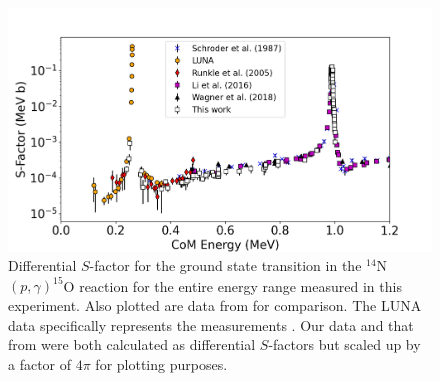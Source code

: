 \begin{figure}
		\includegraphics[width=1.0\linewidth]{figures/full_gs.png}
	\caption{Differential $S$-factor for the ground state transition in the $^{14}$N$\left( p,\gamma \right) ^{15}$O reaction for the entire energy range measured in this experiment. Also plotted are data from \cite{Schroder1987, Formicola2004, Imbriani2005, Runkle2005, Marta2008, Marta2011, Li2016, Wagner2018} for comparison. The LUNA data specifically represents the measurements \cite{Formicola2004, Imbriani2005, Marta2008, Marta2011}. Our data and that from \citet{Li2016} were both calculated as differential $S$-factors but scaled up by a factor of $4\pi$ for plotting purposes. }
	\label{fig: fullGS}
\end{figure}




